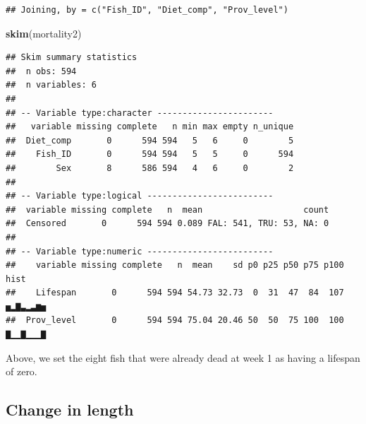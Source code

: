 \documentclass[]{book}
\newenvironment{Shaded}{\begin{snugshade}}{\end{snugshade}}
\newcommand{\DataTypeTok}[1]{\textcolor[rgb]{0.13,0.29,0.53}{#1}}
\newcommand{\KeywordTok}[1]{\textcolor[rgb]{0.13,0.29,0.53}{\textbf{#1}}}
\newcommand{\NormalTok}[1]{#1}
\newcommand{\OperatorTok}[1]{\textcolor[rgb]{0.81,0.36,0.00}{\textbf{#1}}}
\newcommand{\StringTok}[1]{\textcolor[rgb]{0.31,0.60,0.02}{#1}}
\begin{document}
\begin{verbatim}
## Joining, by = c("Fish_ID", "Diet_comp", "Prov_level")
\end{verbatim}

\begin{Shaded}
\begin{Highlighting}[]
\KeywordTok{skim}\NormalTok{(mortality2)}
\end{Highlighting}
\end{Shaded}

\begin{verbatim}
## Skim summary statistics
##  n obs: 594 
##  n variables: 6 
## 
## -- Variable type:character -----------------------
##   variable missing complete   n min max empty n_unique
##  Diet_comp       0      594 594   5   6     0        5
##    Fish_ID       0      594 594   5   5     0      594
##        Sex       8      586 594   4   6     0        2
## 
## -- Variable type:logical -------------------------
##  variable missing complete   n  mean                    count
##  Censored       0      594 594 0.089 FAL: 541, TRU: 53, NA: 0
## 
## -- Variable type:numeric -------------------------
##    variable missing complete   n  mean    sd p0 p25 p50 p75 p100     hist
##    Lifespan       0      594 594 54.73 32.73  0  31  47  84  107 ▅▂▇▃▂▃▆▅
##  Prov_level       0      594 594 75.04 20.46 50  50  75 100  100 ▇▁▁▇▁▁▁▇
\end{verbatim}

Above, we set the eight fish that were already dead at week 1 as having a lifespan of zero.

\hypertarget{change-in-length}{%
\subsection{Change in length}\label{change-in-length}}

\begin{Shaded}
\end{Shaded}
\end{document}
